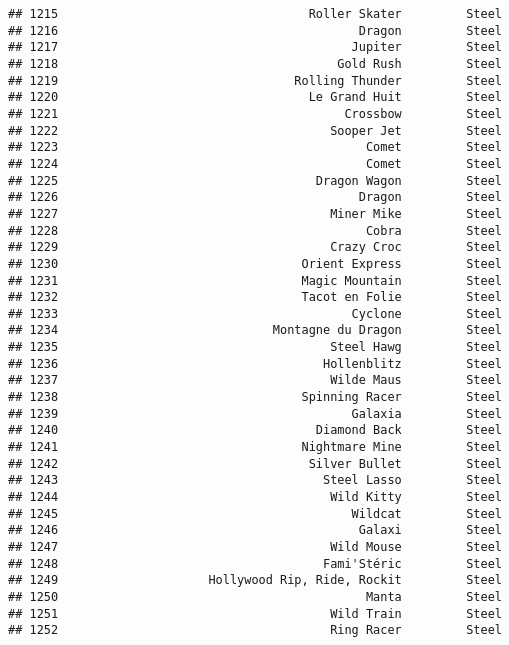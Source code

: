 \documentclass[
]{article}
\begin{document}
\begin{verbatim}
## 1215                                   Roller Skater         Steel
## 1216                                          Dragon         Steel
## 1217                                         Jupiter         Steel
## 1218                                       Gold Rush         Steel
## 1219                                 Rolling Thunder         Steel
## 1220                                   Le Grand Huit         Steel
## 1221                                        Crossbow         Steel
## 1222                                      Sooper Jet         Steel
## 1223                                           Comet         Steel
## 1224                                           Comet         Steel
## 1225                                    Dragon Wagon         Steel
## 1226                                          Dragon         Steel
## 1227                                      Miner Mike         Steel
## 1228                                           Cobra         Steel
## 1229                                      Crazy Croc         Steel
## 1230                                  Orient Express         Steel
## 1231                                  Magic Mountain         Steel
## 1232                                  Tacot en Folie         Steel
## 1233                                         Cyclone         Steel
## 1234                              Montagne du Dragon         Steel
## 1235                                      Steel Hawg         Steel
## 1236                                     Hollenblitz         Steel
## 1237                                      Wilde Maus         Steel
## 1238                                  Spinning Racer         Steel
## 1239                                         Galaxia         Steel
## 1240                                    Diamond Back         Steel
## 1241                                  Nightmare Mine         Steel
## 1242                                   Silver Bullet         Steel
## 1243                                     Steel Lasso         Steel
## 1244                                      Wild Kitty         Steel
## 1245                                         Wildcat         Steel
## 1246                                          Galaxi         Steel
## 1247                                      Wild Mouse         Steel
## 1248                                     Fami'Stéric         Steel
## 1249                     Hollywood Rip, Ride, Rockit         Steel
## 1250                                           Manta         Steel
## 1251                                      Wild Train         Steel
## 1252                                      Ring Racer         Steel

\end{verbatim}
\end{document}
